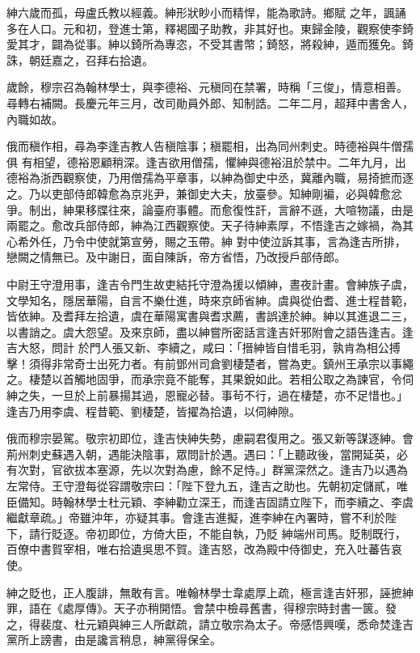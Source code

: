 \begin{pinyinscope}
 紳六歲而孤，母盧氏教以經義。紳形狀眇小而精悍，能為歌詩。鄉賦
 之年，諷誦多在人口。元和初，登進士第，釋褐國子助教，非其好也。東歸金陵，觀察使李錡愛其才，闢為從事。紳以錡所為專恣，不受其書幣；錡怒，將殺紳，遁而獲免。錡誅，朝廷嘉之，召拜右拾遺。



 歲餘，穆宗召為翰林學士，與李德裕、元稹同在禁署，時稱「三俊」，情意相善。尋轉右補闕。長慶元年三月，改司勛員外郎、知制誥。二年二月，超拜中書舍人，內職如故。



 俄而稹作相，尋為李逢吉教人告稹陰事；稹罷相，出為同州刺史。時德裕與牛僧孺俱
 有相望，德裕恩顧稍深。逢吉欲用僧孺，懼紳與德裕沮於禁中。二年九月，出德裕為浙西觀察使，乃用僧孺為平章事，以紳為御史中丞，冀離內職，易掎摭而逐之。乃以吏部侍郎韓愈為京兆尹，兼御史大夫，放臺參。知紳剛褊，必與韓愈忿爭。制出，紳果移牒往來，論臺府事體。而愈復性訐，言辭不遜，大喧物議，由是兩罷之。愈改兵部侍郎，紳為江西觀察使。天子待紳素厚，不悟逢吉之嫁禍，為其心希外任，乃令中使就第宣勞，賜之玉帶。紳
 對中使泣訴其事，言為逢吉所排，戀闕之情無已。及中謝日，面自陳訴，帝方省悟，乃改授戶部侍郎。



 中尉王守澄用事，逢吉令門生故吏結托守澄為援以傾紳，晝夜計畫。會紳族子虞，文學知名，隱居華陽，自言不樂仕進，時來京師省紳。虞與從伯耆、進士程昔範，皆依紳。及耆拜左拾遺，虞在華陽寓書與耆求薦，書誤達於紳。紳以其進退二三，以書誚之。虞大怨望。及來京師，盡以紳嘗所密話言逢吉奸邪附會之語告逢吉。逢吉大怒，問計
 於門人張又新、李續之，咸曰：「搢紳皆自惜毛羽，孰肯為相公搏擊！須得非常奇士出死力者。有前鄧州司倉劉棲楚者，嘗為吏。鎮州王承宗以事繩之。棲楚以首觸地固爭，而承宗竟不能奪，其果銳如此。若相公取之為諫官，令伺紳之失，一旦於上前暴揚其過，恩寵必替。事茍不行，過在棲楚，亦不足惜也。」逢吉乃用李虞、程昔範、劉棲楚，皆擢為拾遺，以伺紳隙。



 俄而穆宗晏駕。敬宗初即位，逢吉快紳失勢，慮嗣君復用之。張又新等謀逐紳。會
 荊州刺史蘇遇入朝，遇能決陰事，眾問計於遇。遇曰：「上聽政後，當開延英，必有次對，官欲拔本塞源，先以次對為慮，餘不足恃。」群黨深然之。逢吉乃以遇為左常侍。王守澄每從容謂敬宗曰：「陛下登九五，逢吉之助也。先朝初定儲貳，唯臣備知。時翰林學士杜元穎、李紳勸立深王，而逢吉固請立陛下，而李續之、李虞繼獻章疏。」帝雖沖年，亦疑其事。會逢吉進擬，進李紳在內署時，嘗不利於陛下，請行貶逐。帝初即位，方倚大臣，不能自執，乃貶
 紳端州司馬。貶制既行，百僚中書賀宰相，唯右拾遺吳思不賀。逢吉怒，改為殿中侍御史，充入吐蕃告哀使。



 紳之貶也，正人腹誹，無敢有言。唯翰林學士韋處厚上疏，極言逢吉奸邪，誣摭紳罪，語在《處厚傳》。天子亦稍開悟。會禁中檢尋舊書，得穆宗時封書一篋。發之，得裴度、杜元穎與紳三人所獻疏，請立敬宗為太子。帝感悟興嘆，悉命焚逢吉黨所上謗書，由是讒言稍息，紳黨得保全。




\end{pinyinscope}
